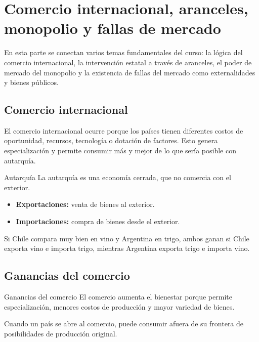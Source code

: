 \section{Comercio internacional, aranceles, monopolio y fallas de mercado}
\label{sec:comercio-monopolio-fallas}

En esta parte se conectan varios temas fundamentales del curso: la lógica del comercio internacional, la intervención estatal a través de aranceles, el poder de mercado del monopolio y la existencia de fallas del mercado como externalidades y bienes públicos.

\subsection{Comercio internacional}

El comercio internacional ocurre porque los países tienen diferentes costos de oportunidad, recursos, tecnología o dotación de factores. Esto genera especialización y permite consumir más y mejor de lo que sería posible con autarquía.

\begin{concepto}{Autarquía}
La autarquía es una economía cerrada, que no comercia con el exterior.
\end{concepto}

\begin{itemize}
    \item \textbf{Exportaciones:} venta de bienes al exterior.
    \item \textbf{Importaciones:} compra de bienes desde el exterior.
\end{itemize}

\begin{ejemplo}
Si Chile compara muy bien en vino y Argentina en trigo, ambos ganan si Chile exporta vino e importa trigo, mientras Argentina exporta trigo e importa vino.
\end{ejemplo}

\subsection{Ganancias del comercio}

\begin{concepto}{Ganancias del comercio}
El comercio aumenta el bienestar porque permite especialización, menores costos de producción y mayor variedad de bienes.
\end{concepto}

Cuando un país se abre al comercio, puede consumir afuera de su frontera de posibilidades de producción original.

